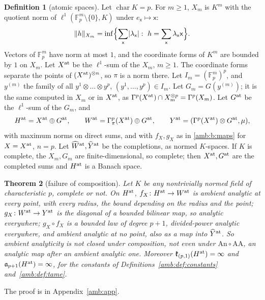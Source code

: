 \documentclass[11pt]{amsart}
\newtheorem{theorem}{Theorem}[section]
\theoremstyle{definition}
\newtheorem{definition}[theorem]{Definition}
\theoremstyle{remark}
\numberwithin{equation}{section}
\newcommand{\F}{\mathbb F}
\newcommand{\abs}[1]{\lvert #1\rvert}
\newcommand{\norm}[1]{\lVert #1\rVert}
\theoremstyle{plain}
\theoremstyle{definition}
\theoremstyle{plain}
\begin{document}
\begin{definition}[atomic spaces]\label{amb:def:atomic}
Let $\operatorname{char}K=p$. For $m\ge1$, $X_m$ is $K^m$ with the quotient norm of $\ell^1(\F_p^m\setminus\{0\},K)$ under $e_{\mathsf x}\mapsto\mathsf x$:
\[
 \norm h_{X_m}=\inf\Bigl\{\sum_{\mathsf x}\abs{\lambda_{\mathsf x}}:\ h=\sum_{\mathsf x}\lambda_{\mathsf x}\mathsf x\Bigr\}.
\]
Vectors of $\F_p^m$ have norm at most $1$, and the coordinate forms of $K^m$ are bounded by $1$ on $X_m$. Let $X^{\rm at}$ be the $\ell^1$-sum of the $X_m$, $m\ge1$. The coordinate forms separate the points of $(X^{\rm at})^{\otimes n}$, so $\pi$ is a norm there. Let $I_m=(\F_p^m)^p$, and $y^{(m)}$ the family of all $y^1\otimes\dots\otimes y^p$, $(y^1,\dots,y^p)\in I_m$. Let $G_m=G(y^{(m)})$; it is the same computed in $X_m$ or in $X^{\rm at}$, as $\Gamma^p(X^{\rm at})\cap X_m^{\otimes p}=\Gamma^p(X_m)$. Let $G^{\rm at}$ be the $\ell^1$-sum of the $G_m$, and
\[
 H^{\rm at}=X^{\rm at}\oplus G^{\rm at},\qquad
 W^{\rm at}=\Gamma^p_\pi(X^{\rm at})\oplus G^{\rm at},\qquad
 Y^{\rm at}=(\Gamma^p(X^{\rm at})\otimes G^{\rm at},\mu),
\]
with maximum norms on direct sums, and with $f_X,g_X$ as in \eqref{amb:b:maps} for $X=X^{\rm at}$, $n=p$. Let $\widehat W^{\rm at},\widehat Y^{\rm at}$ be the completions, as normed $K$-spaces. If $K$ is complete, the $X_m,G_m$ are finite-dimensional, so complete; then $X^{\rm at},G^{\rm at}$ are the completed sums and $H^{\rm at}$ is a Banach space.
\end{definition}

\begin{theorem}[failure of composition]\label{amb:thm:failure}
Let $K$ be any nontrivially normed field of characteristic $p$, complete or not. On $H^{\rm at}$, $f_X\colon H^{\rm at}\to W^{\rm at}$ is ambient analytic at every point, with every radius, the bound depending on the radius and the point; $g_X\colon W^{\rm at}\to Y^{\rm at}$ is the diagonal of a bounded bilinear map, so analytic everywhere; $g_X\circ f_X$ is a bounded law of degree $p+1$, divided-power analytic everywhere, and ambient analytic at no point, also as a map into $\widehat Y^{\rm at}$. So ambient analyticity is not closed under composition, not even under $\mathrm{An}\circ\mathrm{AA}$, an analytic map after an ambient analytic one. Moreover $\mathfrak k_{(p,1)}(H^{\rm at})=\infty$ and $\mathfrak a_{p+1}(H^{\rm at})=\infty$, for the constants of Definitions~\ref{amb:def:constants} and~\ref{amb:def:tame}.
\end{theorem}
The proof is in Appendix~\ref{amb:app}.
\end{document}
